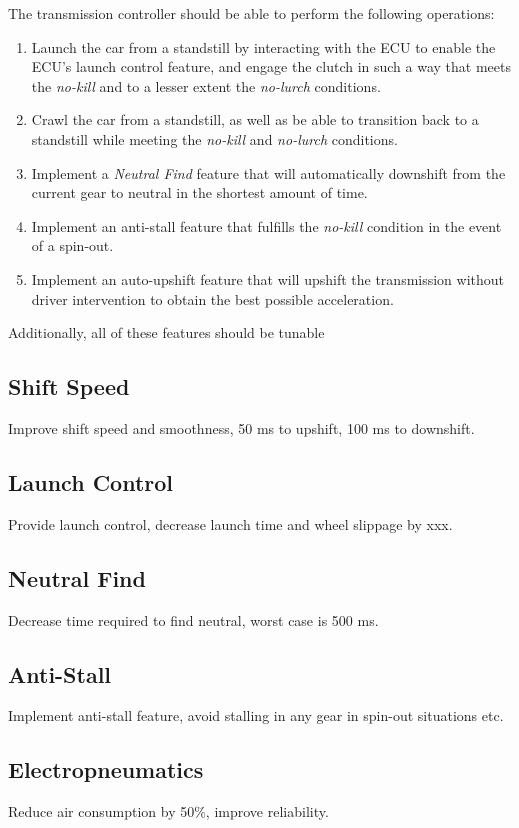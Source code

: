 The transmission controller should be able to perform the following operations:
\begin{enumerate}
  \item Launch the car from a standstill by interacting with the ECU to enable the ECU's launch control feature, and engage the clutch in such a way that meets the \emph{no-kill} and to a lesser extent the \emph{no-lurch} conditions.
  \item Crawl the car from a standstill, as well as be able to transition back to a standstill while meeting the \emph{no-kill} and \emph{no-lurch} conditions.
  \item Implement a \emph{Neutral Find} feature that will automatically downshift from the current gear to neutral in the shortest amount of time.
  \item Implement an anti-stall feature that fulfills the \emph{no-kill} condition in the event of a spin-out.
  \item Implement an auto-upshift feature that will upshift the transmission without driver intervention to obtain the best possible acceleration.
\end{enumerate}

Additionally, all of these features should be tunable 


\subsection{Shift Speed}

Improve shift speed and smoothness, 50 ms to upshift, 100 ms to downshift.


\subsection{Launch Control}

Provide launch control, decrease launch time and wheel slippage by
xxx.


\subsection{Neutral Find}

Decrease time required to find neutral, worst case is 500 ms.


\subsection{Anti-Stall}

Implement anti-stall feature, avoid stalling in any gear in spin-out
situations etc.


\subsection{Electropneumatics}

Reduce air consumption by 50\%, improve reliability. 